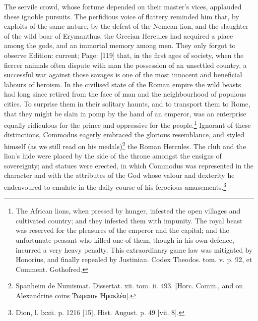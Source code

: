 The servile crowd, whose fortune depended on their master\texthebrew{}’s vices, applauded these ignoble pursuits. The perfidious voice of flattery reminded him that, by exploits of the same nature, by the defeat of the Nemean lion, and the slaughter of the wild boar of Erymanthus, the Grecian Hercules had acquired a place among the gods, and an immortal memory among men. They only forgot to observe Edition: current; Page: [119] that, in the first ages of society, when the fiercer animals often dispute with man the possession of an unsettled country, a successful war against those savages is one of the most innocent and beneficial labours of heroism. In the civilised state of the Roman empire the wild beasts had long since retired from the face of man and the neighbourhood of populous cities. To surprise them in their solitary haunts, and to transport them to Rome, that they might be slain in pomp by the hand of an emperor, was an enterprise equally ridiculous for the prince and oppressive for the people.\footnote{The African lions, when pressed by hunger, infested the open villages and cultivated country; and they infested them with impunity. The royal beast was reserved for the pleasures of the emperor and the capital; and the unfortunate peasant who killed one of them, though in his own defence, incurred a very heavy penalty. This extraordinary game law was mitigated by Honorius, and finally repealed by Justinian. Codex Theodos. tom. v. p. 92, et Comment. Gothofred.} Ignorant of these distinctions, Commodus eagerly embraced the glorious resemblance, and styled himself (as we still read on his medals)\footnote{Spanheim de Numismat. Dissertat. xii. tom. ii. 493. [Horc. Comm., and on Alexandrine coins \textgreek{\texthebrew{Ῥ}ωμαιον \texthebrew{Ἡ}ρακλέα}].} the Roman Hercules. The club and the lion\texthebrew{}’s hide were placed by the side of the throne amongst the ensigns of sovereignty; and statues were erected, in which Commodus was represented in the character and with the attributes of the God whose valour and dexterity he endeavoured to emulate in the daily course of his ferocious amusements.\footnote{Dion, l. lxxii. p. 1216 [15]. Hist. August. p. 49 [vii. 8].}


